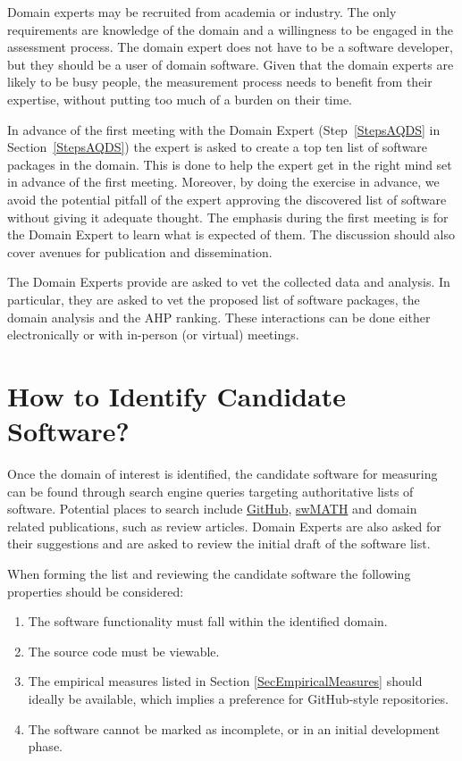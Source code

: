 \documentclass[letterpaper,cleveref]{lipics-v2019}
\begin{document}
Domain experts may be recruited from academia or industry.  The only
requirements are knowledge of the domain and a willingness to be engaged in the
assessment process.  The domain expert does not have to be a software developer,
but they should be a user of domain software.  Given that the domain experts are
likely to be busy people, the measurement process needs to benefit from their
expertise, without putting too much of a burden on their time.

In advance of the first meeting with the Domain Expert (Step~\ref{StepsAQDS} in
Section~\ref{StepsAQDS}) the expert is asked to create a top ten list of
software packages in the domain.  This is done to help the expert get in the
right mind set in advance of the first meeting.  Moreover, by doing the exercise
in advance, we avoid the potential pitfall of the expert approving the
discovered list of software without giving it adequate thought.  The emphasis
during the first meeting is for the Domain Expert to learn what is expected of
them.  The discussion should also cover avenues for publication and
dissemination.

The Domain Experts provide are asked to vet the collected data and analysis.  In
particular, they are asked to vet the proposed list of software packages, the
domain analysis and the AHP ranking.  These interactions can be done either
electronically or with in-person (or virtual) meetings.  

\section{How to Identify Candidate Software?} \label{SecIdentifyCandSoft}

Once the domain of interest is identified, the candidate software for measuring
can be found through search engine queries targeting authoritative lists of
software.  Potential places to search include \href{https://github.com/}
{GitHub}, \href{https://swmath.org/} {swMATH} and domain related publications,
such as review articles. Domain Experts are also asked for their suggestions and
are asked to review the initial draft of the software list.  

When forming the list and reviewing the candidate software the following
properties should be considered:

\begin{enumerate}
\item The software functionality must fall within the identified domain.
\item The source code must be viewable.
\item The empirical measures listed in Section \ref{SecEmpiricalMeasures} should
  ideally be available, which implies a preference for GitHub-style
  repositories.
\item The software cannot be marked as incomplete, or in an initial development
  phase.
\end{enumerate}
\end{document}
